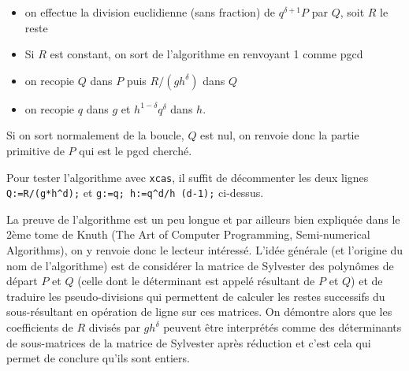\documentclass[a4paper,11pt]{article}
\begin{document}
\begin{giacjshere}
\begin{itemize}
  \item on effectue la division euclidienne (sans fraction) de $q^{\delta + 1}
  P$ par $Q$, soit $R$ le reste
  
  \item Si $R$ est constant, on sort de l'algorithme en renvoyant 1 comme pgcd
  
  \item on recopie $Q$ dans $P$ puis $R / ( g h^{\delta} )$ dans $Q$
  
  \item on recopie $q$ dans $g$ et $h^{1 - \delta} q^{\delta}$ dans $h$.
\end{itemize}
Si on sort normalement de la boucle, $Q$ est nul, on renvoie donc la partie
primitive de $P$ qui est le pgcd cherché.

Pour tester l'algorithme avec {\tt{xcas}}, il suffit de décommenter les
deux lignes {\tt{Q:=R/(g*h\^{ }d);}} et {\tt{g:=q; h:=q\^{ }d/h\^{
}(d-1);}} ci-dessus.

La preuve de l'algorithme est un peu longue et par ailleurs bien expliqu\'ee
dans le 2ème tome de Knuth (The Art of Computer Programming, Semi-numerical
Algorithms), on y renvoie donc le lecteur intéressé. L'idée générale
(et l'origine du nom de l'algorithme) 
est de considérer la matrice de Sylvester des polynômes de
départ $P$ et $Q$ (celle dont le déterminant est appelé résultant de $P$ et
$Q$) et de traduire les pseudo-divisions qui permettent de calculer les restes
successifs du sous-résultant en opération de ligne sur ces matrices. On
démontre alors que les coefficients de $R$ divisés par $g h^{\delta}$ peuvent
être interprétés comme des déterminants de sous-matrices de la matrice de
Sylvester après réduction et c'est cela qui permet de conclure qu'ils sont
entiers.


\end{giacjshere}
\end{document}
